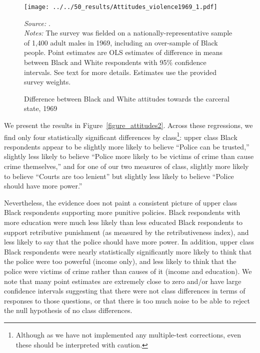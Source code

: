 \documentclass[12pt]{article}
\begin{document}
\begin{figure}[h!]
 \begin{center}
 \caption{Difference between Black and White attitudes towards the carceral state, 1969}
 \small
		 \texttt{[image: ../../50\_results/Attitudes\_violence1969\_1.pdf]}
 \label{figure_attitudes_class}
 	\end{center}
 	{\scriptsize{\emph{Source:} \cite{Violence1969}. }} \\
	{\scriptsize{\emph{Notes:} The survey was fielded on a nationally-representative sample of 1,400 adult males in 1969, including an over-sample of Black people.  Point estimates are OLS estimates of difference in means between Black and White respondents with 95\% confidence intervals.  See text for more details. Estimates use the provided survey weights. \singlespacing }}
\end{figure} \normalsize


We present the results in Figure~\ref{figure_attitudes2}. Across these regressions, we find only four statistically significant differences by class\footnote{Although as we have not implemented any multiple-test corrections, even these should be interpreted with caution.}: upper class Black respondents appear to be slightly more likely to believe ``Police can be trusted,'' slightly less likely to believe ``Police more likely to be victims of crime than cause crime themselves,'' and for one of our two measures of class, slightly more likely to believe ``Courts are too lenient'' but slightly less likely to believe ``Police should have more power.''

Nevertheless, the evidence does not paint a consistent picture of upper class Black respondents supporting more punitive policies. Black respondents with more education were much less likely than less educated Black respondents to support retributive punishment (as measured by the retributiveness index), and less likely to say that the police should have more power.  In addition, upper class Black respondents were nearly statistically significantly more likely to think that the police were too powerful (income only), and less likely to think that the police were victims of crime rather than causes of it (income and education).  We note that many point estimates are extremely close to zero and/or have large confidence intervals suggesting that there were not class differences in terms of responses to those questions, or that there is too much noise to be able to reject the null hypothesis of no class differences.
\end{document}

